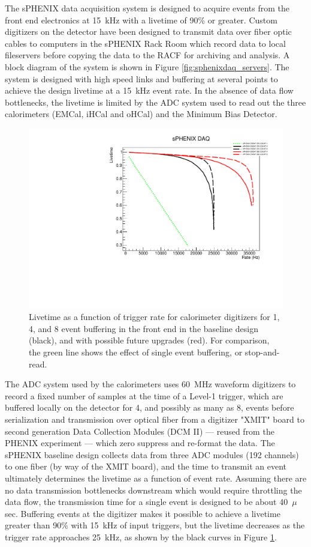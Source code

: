 The sPHENIX data acquisition system is designed to acquire events from
the front end electronics at 15~kHz with a livetime of 90\% or greater.
Custom digitizers on the detector have been designed to transmit data
over fiber optic cables to computers in the sPHENIX Rack Room which
record data to local fileservers before copying the data to the RACF
for archiving and analysis.  A block diagram of the system is shown in
Figure \ref{fig:sphenixdaq_servers}.  The system is designed with high
speed links and buffering at several points to achieve the design
livetime at a 15~kHz event rate.  In the absence of data flow
bottlenecks, the livetime is limited by the ADC system used to read
out the three calorimeters (EMCal, iHCal and oHCal) and the Minimum
Bias Detector.

\begin{figure}
    \centering
    \includegraphics[trim = 0 0 0 25, clip,
    width=0.75\linewidth]{figs/sphenix_daqrate_3.pdf} 
    \caption{Livetime as a function of trigger rate for calorimeter digitizers for
    1, 4, and 8 event buffering in the front end in the baseline design (black),
    and with possible future upgrades (red).  For comparison, the
    green line shows the effect of single event buffering, or
    stop-and-read.} 
    \label{fig:sphenix_daqrate}
\end{figure}

The ADC system used by the calorimeters uses 60~MHz waveform
digitizers to record a fixed number of samples at the time of a
Level-1 trigger, which are buffered locally on the detector for 4, and
possibly as many as 8, events before serialization and transmission
over optical fiber from a digitizer "XMIT" board to second generation
Data Collection Modules (DCM II) --- reused from the PHENIX experiment
--- which zero suppress and re-format the data.  The sPHENIX baseline
design collects data from three ADC modules (192 channels) to one
fiber (by way of the XMIT board), and the time to transmit an event
ultimately determines the livetime as a function of event rate.
Assuming there are no data transmission bottlenecks downstream which
would require throttling the data flow, the transmission time for a
single event is designed to be about 40~$\mu$sec.  Buffering events at
the digitizer makes it possible to achieve a livetime greater than
90\% with 15~kHz of input triggers, but the livetime decreases as the
trigger rate approaches 25~kHz, as shown by the black curves in Figure
\ref{fig:sphenix_daqrate}.

